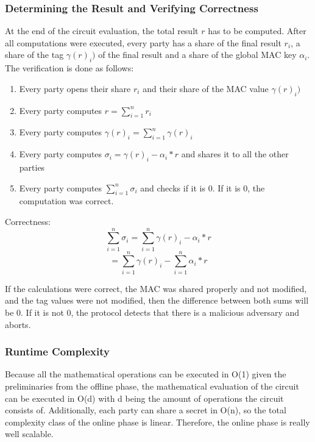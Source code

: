 \documentclass[english,runningheads,a4paper]{llncs}[2018/03/10]
\begin{document}
\subsubsection{Determining the Result and Verifying Correctness}
At the end of the circuit evaluation, the total result $r$ has to be computed. After all computations were executed, every party has a share of the final result \( r_i\), a share of the tag \( \gamma(r)_i)\) of the final result and a share of the global MAC key \( \alpha_i \). The verification is done as follows:

\begin{enumerate}
\item Every party  opens their share \( r_i\) and their share of the MAC value \( \gamma(r)_i) \)
\item Every party computes \( r = \sum_{i=1}^n r_i \) 
\item Every party computes  \( \gamma(r)_i = \sum_{i=1}^n \gamma(r)_i \)
\item Every party computes  \( \sigma_i =  \gamma(r)_i - \alpha_i * r\) and shares it to all the other parties
\item Every party computes \( \sum_{i=1}^n \sigma_i \) and checks if it is \(0\). If it is  \(0\), the computation was correct.
\end{enumerate}
Correctness: 
$$ \sum_{i=1}^n \sigma_i =  \sum_{i=1}^n  \gamma(r)_i - \alpha_i * r $$
$$=  \sum_{i=1}^n  \gamma(r)_i -  \sum_{i=1}^n  \alpha_i * r $$

If the calculations were correct, the MAC was shared properly and not modified, and the tag values were not modified, then the difference between both sums will be 0. If it is not 0, the protocol detects that there is a malicious adversary and aborts.\\

\subsubsection{Runtime Complexity}
Because all the mathematical operations can be executed in O(1) given the preliminaries from the offline phase, the mathematical evaluation of the circuit can be executed in O(d) with d being the amount of operations the circuit consists of. Additionally, each party can share a secret in O(n), so the total complexity class of the online phase is linear. Therefore, the online phase is really well scalable.\\
\end{document}
